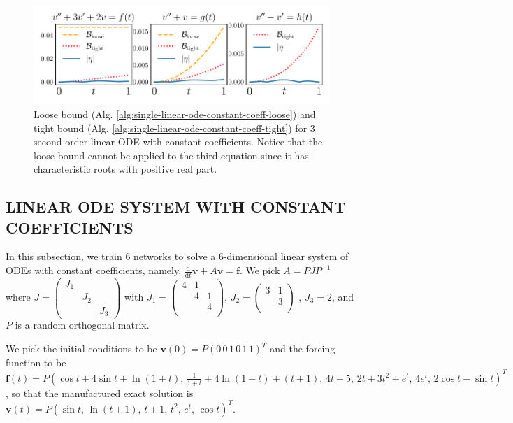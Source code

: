 \documentclass[accepted]{uai2023}
\newcommand{\vect}[1]{\mathbf{#1}}
\begin{document}
    \begin{figure}[!ht]
        \centering
        \includegraphics[width=\linewidth]{assets/2nd-order.pdf}
        \caption{\small
            Loose bound (Alg. \ref{alg:single-linear-ode-constant-coeff-loose}) and tight bound (Alg. \ref{alg:single-linear-ode-constant-coeff-tight}) for 3 second-order linear ODE with constant coefficients.
            Notice that the loose bound cannot be applied to the third equation since it has characteristic roots with positive real part.
        }\label{fig:2nd-order-bound} 
    \end{figure}

\subsection{LINEAR ODE SYSTEM WITH CONSTANT COEFFICIENTS} \label{section:high-dimension}
    \begingroup 
        \setlength\arraycolsep{1pt}
        In this subsection, we train $6$ networks to solve a $6$-dimensional linear system of ODEs with constant coefficients, namely, $\frac{\mathrm{d}}{\mathrm{d}t}\vect{v} + A\vect{v} = \vect{f}$. 
        We pick $A = PJP^{-1}$ where {\small $J=\begin{pmatrix}J_1\\[-0.75ex]&J_2\\[-0.75ex]&&J_3\end{pmatrix}$} with {\small $J_1 = \begin{pmatrix} 4&1\\[-0.75ex]&4&1\\[-0.75ex]&&4\\[-0.5ex]\end{pmatrix}$, $J_2 = \begin{pmatrix} 3&1\\[-0.75ex]&3\\[-0.5ex]\end{pmatrix}$ }, $J_3=2$, and $P$ is a random orthogonal matrix.
    \endgroup

    We pick the initial conditions to be {\small $\vect{v}(0) = P(0\, 0\, 1\, 0\, 1\, 1)^{T}$} and the forcing function to be {\small $\vect{f}(t) = P(\cos t + 4 \sin t  + \ln(1+t),\, \frac{1}{1+t} + 4 \ln(1+t) + (t+1),\, 4t + 5,\, 2t + 3t^2 + e^t,\, 4 e^t,\, 2 \cos t - \sin t )^T$}, so that the manufactured exact solution is {\small $\vect{v}(t) = P ( \sin t,\, \ln(t + 1),\, t + 1,\, t^2,\, e^t,\, \cos t)^T$}.
\end{document}

